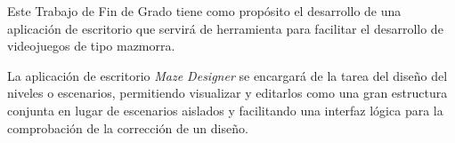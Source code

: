 Este Trabajo de Fin de Grado tiene como propósito el desarrollo de una aplicación de escritorio que servirá de herramienta para facilitar el desarrollo de videojuegos de tipo mazmorra.

La aplicación de escritorio \textit{Maze Designer} se encargará de la tarea del diseño del niveles o escenarios, permitiendo visualizar y editarlos como una gran estructura conjunta en lugar de escenarios aislados y facilitando una interfaz lógica para la comprobación de la corrección de un diseño.